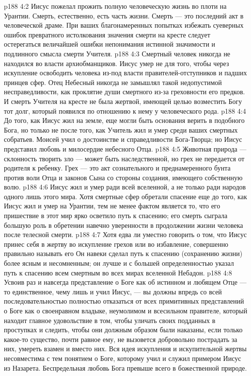 \vs p188 4:2 Иисус пожелал прожить полную человеческую жизнь во плоти на Урантии. Смерть, естественно, есть часть жизни. Смерть --- это последний акт в человеческой драме. При ваших благонамеренных попытках избежать суеверных ошибок превратного истолкования значения смерти на кресте следует остерегаться величайшей ошибки непонимания истинной значимости и подлинного смысла смерти Учителя.
\vs p188 4:3 \pc Смертный человек никогда не находился во власти архиобманщиков. Иисус умер не для того, чтобы через искупление освободить человека из\hyp{}под власти правителей\hyp{}отступников и падших принцев сфер. Отец Небесный никогда не замышлял такой недопустимой несправедливости, как проклятие души смертного из\hyp{}за греховности его предков. И смерть Учителя на кресте не была жертвой, имеющей целью возместить Богу тот долг, который появился по отношению к нему у человеческого рода.
\vs p188 4:4 До того, как Иисус жил на земле, еще могли быть основания верить в подобного Бога, но только не после того, как Учитель жил и умер среди ваших смертных собратьев. Моисей учил о достоинстве и справедливости Бога\hyp{}Творца; но Иисус представил любовь и милосердие небесного Отца.
\vs p188 4:5 Животная природа --- склонность творить зло --- может быть наследственной, но грех не передается от родителя к ребенку. Грех --- это акт сознательного и преднамеренного бунта против воли Отца и законов Сына со стороны создания, имеющего собственную волю.
\vs p188 4:6 Иисус жил и умер ради всей вселенной, а не только ради народов одного лишь этого мира. Хотя смертные сфер обретали спасение еще до того, как Иисус жил и умер на Урантии, тем не менее фактом является то, что его пришествие в этот мир ярко осветило путь к спасению; его смерть сыграла большую роль в обретении навечно уверенности в продолжении жизни человека после телесной смерти.
\vs p188 4:7 Хотя едва ли уместно говорить о том, что Иисус принес себя в жертву во искупление грехов или во избавление, совершенно правильно называть его  Он навеки сделал путь к спасению (сохранению жизни) более ясным и несомненным; он лучше и с большей определенностью указал путь к спасению всем смертным во всех мирах вселенной Небадон.
\vs p188 4:8 Усвоив раз и навсегда представление о Боге как об истинном и любящем Отце --- то единственное, чему лишь и учил Иисус, --- вы должны впредь со всей последовательностью полностью отказаться от всех примитивных представлений о Боге как о своенравном владыке, неумолимом и всесильном правителе, который находит главное удовольствие в том, чтобы уличать своих подданных в проступках и следить, чтобы они должным образом были наказаны, если только какое\hyp{}то существо, почти равное ему, не вызовется добровольно пострадать за них, умереть взамен и вместо них. Вся идея искупления и искупительной жертвы несовместима с тем понятием о Боге, которому учил и служил примером Иисус из Назарета. Беспредельная любовь Бога превыше всего в божественной природе.

